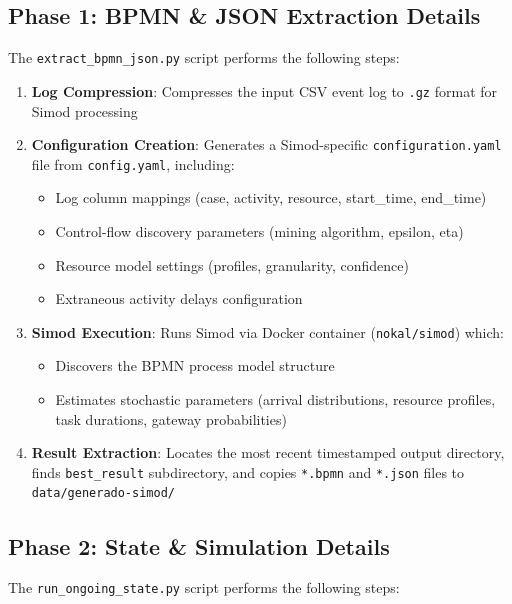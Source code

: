 \documentclass[a4paper]{article}
\begin{document}
\subsection{Phase 1: BPMN \& JSON Extraction Details}

The \texttt{extract\_bpmn\_json.py} script performs the following steps:

\begin{enumerate}
    \item \textbf{Log Compression}: Compresses the input CSV event log to \texttt{.gz} format for Simod processing
    \item \textbf{Configuration Creation}: Generates a Simod-specific \texttt{configuration.yaml} file from \texttt{config.yaml}, including:
\begin{itemize}
        \item Log column mappings (case, activity, resource, start\_time, end\_time)
        \item Control-flow discovery parameters (mining algorithm, epsilon, eta)
        \item Resource model settings (profiles, granularity, confidence)
        \item Extraneous activity delays configuration
\end{itemize}
    \item \textbf{Simod Execution}: Runs Simod via Docker container (\texttt{nokal/simod}) which:
    \begin{itemize}
        \item Discovers the BPMN process model structure
        \item Estimates stochastic parameters (arrival distributions, resource profiles, task durations, gateway probabilities)
    \end{itemize}
    \item \textbf{Result Extraction}: Locates the most recent timestamped output directory, finds \texttt{best\_result} subdirectory, and copies \texttt{*.bpmn} and \texttt{*.json} files to \texttt{data/generado-simod/}
\end{enumerate}

\subsection{Phase 2: State \& Simulation Details}

The \texttt{run\_ongoing\_state.py} script performs the following steps:
\end{document}
